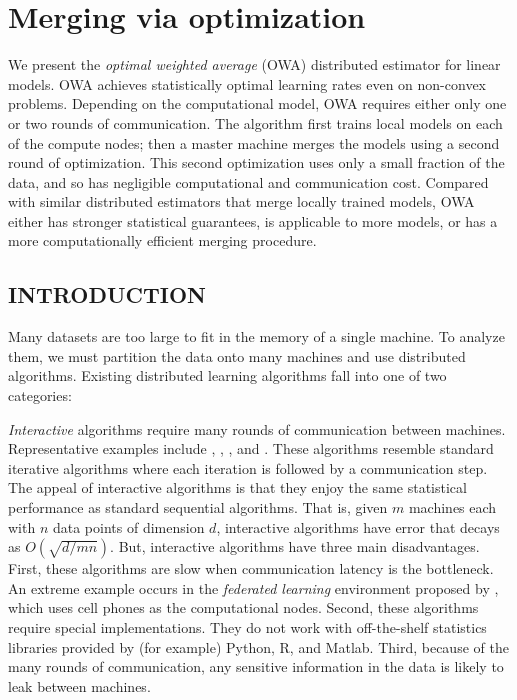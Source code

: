 \documentclass[thesis.tex]{subfiles}
\begin{document}
\chapter{Merging via optimization}

We present the \emph{optimal weighted average} (OWA) distributed estimator for linear models. 
OWA achieves statistically optimal learning rates even on non-convex problems.
Depending on the computational model, OWA requires either only one or two rounds of communication.
The algorithm first trains local models on each of the compute nodes;
then a master machine merges the models using a second round of optimization. 
This second optimization uses only a small fraction of the data, 
and so has negligible computational and communication cost.
Compared with similar distributed estimators that merge locally trained models,
OWA either has stronger statistical guarantees, 
is applicable to more models,
or has a more computationally efficient merging procedure.


\section{INTRODUCTION}

Many datasets are too large to fit in the memory of a single machine.
To analyze them, we must partition the data onto many machines and use distributed algorithms.
Existing distributed learning algorithms fall into one of two categories:

\emph{Interactive} algorithms require many rounds of communication between machines.
Representative examples include \citet{boyd2011distributed}, \citet{li2014scaling}, \cite{ma2015adding}, and \cite{zhao2017scope}. 
These algorithms resemble standard iterative algorithms where each iteration is followed by a communication step. 
The appeal of interactive algorithms is that they enjoy the same statistical performance as standard sequential algorithms.
That is, given $m$ machines each with $n$ data points of dimension $d$, interactive algorithms have error that decays as $O(\sqrt{d/mn})$.
But, interactive algorithms have three main disadvantages.
First, these algorithms are slow when communication latency is the bottleneck.
An extreme example occurs in the \emph{federated learning} environment proposed by \cite{mcmahan2017communication}, which uses cell phones as the computational nodes. 
Second, these algorithms require special implementations.
They do not work with off-the-shelf statistics libraries provided by (for example) Python, R, and Matlab.
Third, because of the many rounds of communication, any sensitive information in the data is likely to leak between machines.
\end{document}
